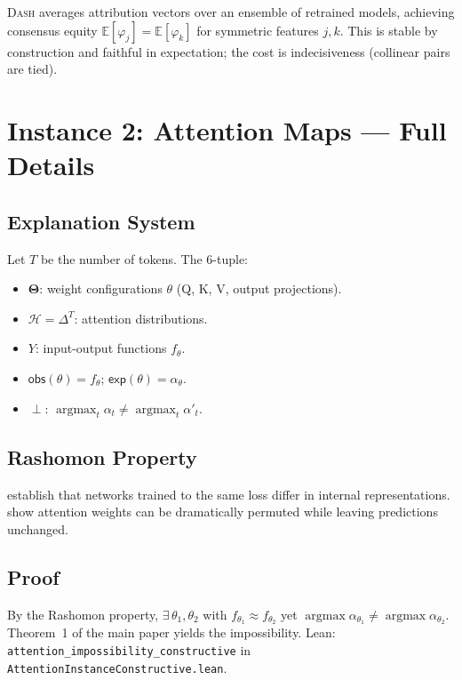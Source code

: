 \documentclass{article}
\newcommand{\E}{\mathbb{E}}
\newcommand{\DASH}{\textsc{Dash}}
\newcommand{\Params}{\mathbf{\Theta}}
\newcommand{\sH}{\mathcal{H}}
\newcommand{\incomp}{\perp}
\begin{document}
\DASH{} averages attribution vectors over an ensemble of retrained models, achieving consensus equity $\E[\varphi_j] = \E[\varphi_k]$ for symmetric features $j, k$.  This is stable by construction and faithful in expectation; the cost is indecisiveness (collinear pairs are tied).

\section{Instance 2: Attention Maps --- Full Details}
\label{sec:attn-full}

\subsection{Explanation System}

Let $T$ be the number of tokens.  The 6-tuple:
\begin{itemize}
  \item $\Params$: weight configurations $\theta$ (Q, K, V, output projections).
  \item $\sH = \Delta^T$: attention distributions.
  \item $Y$: input-output functions $f_\theta$.
  \item $\mathsf{obs}(\theta) = f_\theta$; $\mathsf{exp}(\theta) = \alpha_\theta$.
  \item $\incomp$: $\operatorname{argmax}_t \alpha_t \neq \operatorname{argmax}_t \alpha'_t$.
\end{itemize}

\subsection{Rashomon Property}

\citet{damour2022underspecification} establish that networks trained to the same loss differ in internal representations.  \citet{jainwallace2019} show attention weights can be dramatically permuted while leaving predictions unchanged.

\subsection{Proof}

By the Rashomon property, $\exists\, \theta_1, \theta_2$ with $f_{\theta_1} \approx f_{\theta_2}$ yet $\operatorname{argmax} \alpha_{\theta_1} \neq \operatorname{argmax} \alpha_{\theta_2}$.  Theorem~1 of the main paper yields the impossibility.  Lean: \texttt{attention\_impossibility\_constructive} in \texttt{AttentionInstanceConstructive.lean}.
\end{document}
